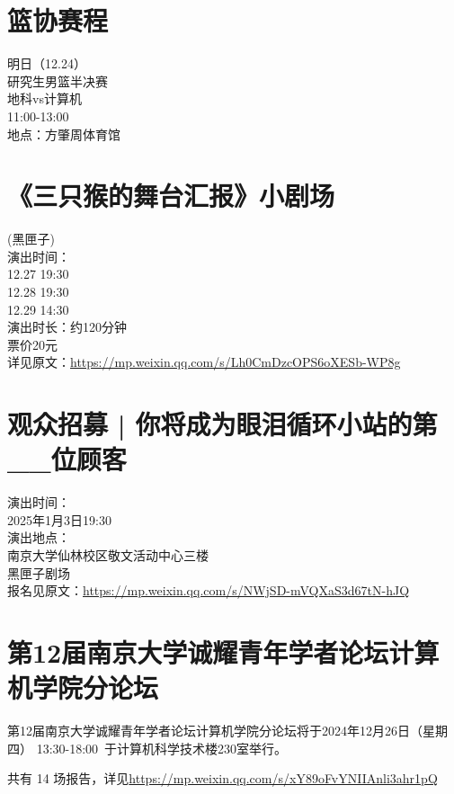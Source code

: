 \documentclass[letterpaper, 12pt]{article}
\begin{document}
\begin{multicols}{2}
\section{篮协赛程}
明日（12.24）\\
研究生男篮半决赛\\
地科vs计算机\\
 11:00-13:00\\
地点：方肇周体育馆

\section{《三只猴的舞台汇报》小剧场}
(黑匣子)\\
演出时间：\\
12.27 19:30\\
12.28 19:30\\
12.29 14:30\\
演出时长：约120分钟\\
票价20元\\
详见原文：\url{https://mp.weixin.qq.com/s/Lh0CmDzcOPS6oXESb-WP8g}

\section{观众招募 | 你将成为眼泪循环小站的第\_\_位顾客}
演出时间：\\
2025年1月3日19:30\\
演出地点：\\
南京大学仙林校区敬文活动中心三楼\\
黑匣子剧场\\
报名见原文：\url{https://mp.weixin.qq.com/s/NWjSD-mVQXaS3d67tN-hJQ}

\section{第12届南京大学诚耀青年学者论坛计算机学院分论坛}
第12届南京大学诚耀青年学者论坛计算机学院分论坛将于2024年12月26日（星期四） 13:30-18:00 于计算机科学技术楼230室举行。

共有 14 场报告，详见\url{https://mp.weixin.qq.com/s/xY89oFvYNIIAnli3ahr1pQ}
\end{multicols} 
\end{document}
